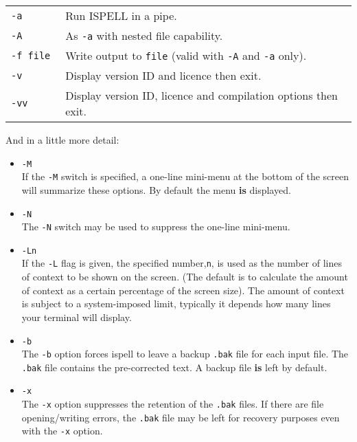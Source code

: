 \documentclass[noabs,nolof,twoside,11pt]{starlink}
\begin{document}
\begin{tabular}{ll}
\texttt{-a       } & Run ISPELL in a pipe.\\
\texttt{-A       } & As \verb+-a+ with nested file capability.\\
\texttt{-f file  } & Write output to \verb+file+ (valid with \verb+-A+ and
                  \verb+-a+ only).\\

\texttt{-v       } & Display version ID and licence then exit.\\
\texttt{-vv      } & Display version ID, licence and compilation options then
                  exit.\\
\end{tabular}

And in a little more detail:

\begin{itemize}
\item {\Large\tt -M} \\
If the \verb+-M+ switch is specified, a one-line mini-menu at the bottom of the
screen will summarize these options. By default the menu \textbf{is} displayed.

\item {\Large\tt -N} \\
The \verb+-N+ switch may be used to suppress the one-line mini-menu.

\item {\Large\tt -Ln} \\
If the \verb+-L+ flag is given, the specified number,\verb+n+, is used as the
number of lines of context to be shown on the screen.  (The default is to
calculate the amount of context as a certain percentage of the screen
size).  The amount of context is subject to a system-imposed limit, typically
it depends how many lines your terminal will display.

\item {\Large\tt -b} \\
The \verb+-b+ option forces ispell to leave a backup \verb+.bak+ file for each
input file.
The \verb+.bak+ file contains the pre-corrected text.
A backup file \textbf{is} left by default.

\item {\Large\tt -x} \\
The \verb+-x+ option suppresses the retention of the \verb+.bak+ files.
If there are file opening/writing errors, the \verb+.bak+ file may be left for
recovery purposes even with the \verb+-x+ option.


\end{itemize}
\end{document}
